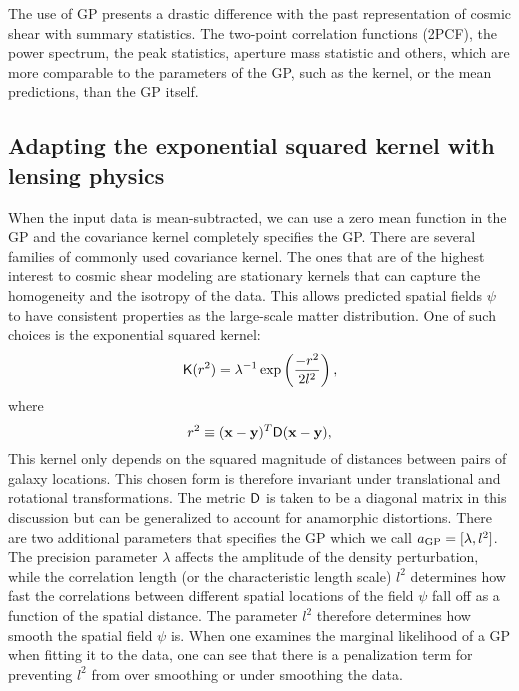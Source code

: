 The use of GP presents a drastic difference with the past representation of
cosmic shear with summary statistics.  
The two-point correlation functions (2PCF), 
the power spectrum, the peak statistics, aperture mass statistic and others, 
which are more comparable to the parameters of the GP, such as the kernel, or the
mean predictions, than the GP itself.



\subsection{Adapting the exponential squared kernel with lensing physics}
When the input data is mean-subtracted, we can use a zero mean function in the
GP and the covariance kernel completely specifies the GP. 
There are several families of commonly used covariance kernel.
The ones that are of the highest interest to cosmic shear modeling 
are stationary kernels that can capture 
the homogeneity and the isotropy of the data. This allows predicted spatial fields
$\psi$ to have consistent properties as the large-scale matter distribution.
%
One of such choices is the exponential squared kernel: 
\begin{equation}
	\mathsf{K}(r^2) = \lambda^{-1} \exp\left(\frac{-r^2}{2 l^2}\right),
	\label{eq:exp_sq_kernel}
\end{equation}
where 
\begin{equation}
	r^2 \equiv (\mathbf{x} - \mathbf{y})^T \mathsf{D} (\mathbf{x} - \mathbf{y}), 
\end{equation}
This kernel only depends on the
squared magnitude of distances between pairs of galaxy locations. 
This chosen form is therefore invariant
under translational and rotational transformations.
The metric $\mathsf{D}$ is taken to be a diagonal matrix in this discussion but  
can be generalized to account for anamorphic distortions. There are two
additional parameters that specifies the GP which we call $a_{\rm GP} =
[\lambda, l^2]$.
The precision parameter $\lambda$ affects the 
amplitude of the density perturbation, while the correlation length (or
the characteristic length scale) $l^2$ 
determines how fast the correlations between different spatial locations of the
field $\psi$ fall off as a function of the spatial distance. The parameter
$l^2$ therefore determines how smooth the spatial field $\psi$ is. When one
examines the marginal likelihood of a GP when fitting it to the data, 
one can see that there is a penalization term for preventing $l^2$ from
over smoothing or under smoothing the data.

